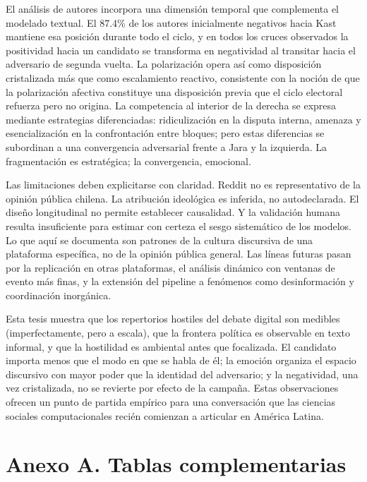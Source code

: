 \documentclass[
  letterpaper,
  numbers=noendperiod,
  fontsize=11pt,
  DIV=12,
  titlepage=false]{scrreprt}
\begin{document}
El análisis de autores incorpora una dimensión temporal que complementa
el modelado textual. El 87.4\% de los autores inicialmente negativos
hacia Kast mantiene esa posición durante todo el ciclo, y en todos los
cruces observados la positividad hacia un candidato se transforma en
negatividad al transitar hacia el adversario de segunda vuelta. La
polarización opera así como disposición cristalizada más que como
escalamiento reactivo, consistente con la noción de que la polarización
afectiva constituye una disposición previa que el ciclo electoral
refuerza pero no origina. La competencia al interior de la derecha se
expresa mediante estrategias diferenciadas: ridiculización en la disputa
interna, amenaza y esencialización en la confrontación entre bloques;
pero estas diferencias se subordinan a una convergencia adversarial
frente a Jara y la izquierda. La fragmentación es estratégica; la
convergencia, emocional.

Las limitaciones deben explicitarse con claridad. Reddit no es
representativo de la opinión pública chilena. La atribución ideológica
es inferida, no autodeclarada. El diseño longitudinal no permite
establecer causalidad. Y la validación humana resulta insuficiente para
estimar con certeza el sesgo sistemático de los modelos. Lo que aquí se
documenta son patrones de la cultura discursiva de una plataforma
específica, no de la opinión pública general. Las líneas futuras pasan
por la replicación en otras plataformas, el análisis dinámico con
ventanas de evento más finas, y la extensión del pipeline a fenómenos
como desinformación y coordinación inorgánica.

Esta tesis muestra que los repertorios hostiles del debate digital son
medibles (imperfectamente, pero a escala), que la frontera política es
observable en texto informal, y que la hostilidad es ambiental antes que
focalizada. El candidato importa menos que el modo en que se habla de
él; la emoción organiza el espacio discursivo con mayor poder que la
identidad del adversario; y la negatividad, una vez cristalizada, no se
revierte por efecto de la campaña. Estas observaciones ofrecen un punto
de partida empírico para una conversación que las ciencias sociales
computacionales recién comienzan a articular en América Latina.

\clearpage


\chapter{Anexo A. Tablas
complementarias}\label{anexo-a.-tablas-complementarias}
\end{document}
